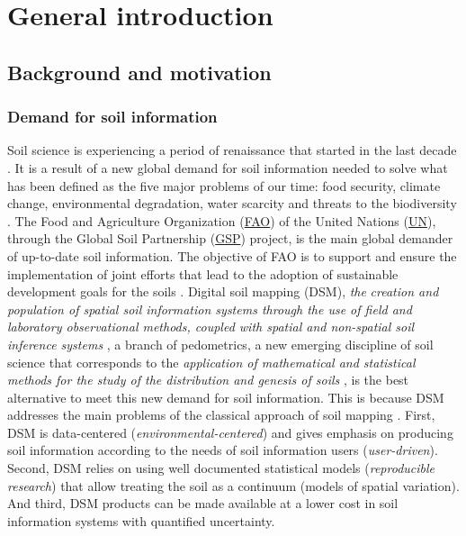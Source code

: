 \setcounter{page}{1}
\artigofalse
\chapter{General introduction}
\label{chap:introduction}

\section{Background and motivation}

\subsection{Demand for soil information}

Soil science is experiencing a period of renaissance that started in the last 
decade \cite{HarteminkEtAl2008}. It is a result of a new global demand for soil 
information needed to solve what has been defined as the five major problems of
our time: food security, climate change, environmental degradation, water 
scarcity and threats to the biodiversity \cite{SanchezEtAl2009}. The Food and 
Agriculture Organization (\href{http://www.fao.org/index_en.htm}{FAO}) of the 
United Nations (\href{http://www.un.org/en/}{UN}), through the Global Soil 
Partnership (\href{http://www.fao.org/globalsoilpartnership/en/}{GSP}) project, 
is the main global demander of up-to-date soil information. The objective of 
FAO is to support and ensure the implementation of joint efforts that lead to 
the adoption of sustainable development goals for the soils \cite{FAO2012}. 
Digital soil mapping (DSM), \textit{the} \textit{creation and population of 
spatial soil information systems through the use of field and laboratory 
observational methods, coupled with spatial and non-spatial soil inference 
systems} \cite{LagacherieEtAl2007a}, a branch of pedometrics, a new emerging 
discipline of soil science that corresponds to the \textit{application of 
mathematical and statistical methods for the study of the distribution and 
genesis of soils} \cite{Heuvelink2003}, is the best alternative to meet this 
new demand for soil information. This is because DSM addresses the main 
problems of the classical approach of soil mapping \cite{Kempen2011}. First, 
DSM is data-centered (\textit{environmental-centered}) and gives emphasis on 
producing soil information according to the needs of soil information users 
(\textit{user-driven}). Second, DSM relies on using well documented statistical
models (\textit{reproducible research}) that allow treating the soil as a 
continuum (models of spatial variation). And third, DSM products can be made 
available at a lower cost in soil information systems with quantified 
uncertainty.


